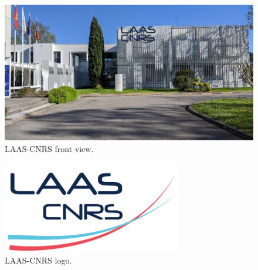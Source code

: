 \begin{appendices}
	\begin{figure}[H]
		\centering
		\includegraphics[width=1\textwidth]{../images/LAAS_CNRS_Toulouse.jpeg}
		\caption{LAAS-CNRS front view.\cite{echo-science}}
		\label{fig:laas-front-view}
	\end{figure}

	\begin{figure}[H]
		\centering
		\includegraphics[width=0.7\textwidth]{../images/logo-laas.jpg}
		\caption{LAAS-CNRS logo.}
		\label{fig:laas-cnrs-logo}
	\end{figure}
\end{appendices}